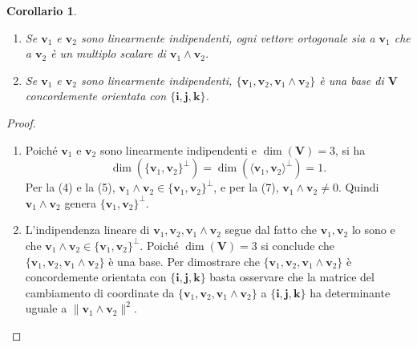 \documentclass{article}
\theoremstyle{plain}
\newtheorem{cor}{Corollario}
\theoremstyle{definition}
\theoremstyle{remark}
\begin{document}
\begin{bxthm}
\begin{cor}
\begin{enumerate}\hfill
\setcounter{enumi}{7}
\item Se $\mathbf{v}_1$ e $\mathbf{v}_2$ sono linearmente indipendenti, ogni vettore ortogonale sia a $\mathbf{v}_1$ che a $\mathbf{v}_2$ è un multiplo scalare di $\mathbf{v}_1 \wedge \mathbf{v}_2$.
\item Se $\mathbf{v}_1$ e $\mathbf{v}_2$ sono linearmente indipendenti, $\{\mathbf{v}_1, \mathbf{v}_2, \mathbf{v}_1 \wedge \mathbf{v}_2\}$ è una base di $\mathbf{V}$ concordemente orientata con $\{\mathbf{i}, \mathbf{j}, \mathbf{k}\}$.
\end{enumerate}    
\end{cor}
\end{bxthm}
\begin{proof}
\begin{enumerate}\hfill
\setcounter{enumi}{7}
\item Poiché $\mathbf{v}_1$ e $\mathbf{v}_2$ sono linearmente indipendenti e $\dim(\mathbf{V})=3$, si ha
\[
\dim\left( \{\mathbf{v}_1, \mathbf{v}_2\}^\perp \right) = \dim\left( \langle \mathbf{v}_1, \mathbf{v}_2 \rangle^\perp \right) = 1.
\]
Per la (4) e la (5), $\mathbf{v}_1 \wedge \mathbf{v}_2 \in \{ \mathbf{v}_1, \mathbf{v}_2 \}^\perp$, e per la (7), $\mathbf{v}_1 \wedge \mathbf{v}_2 \neq 0$. Quindi $\mathbf{v}_1 \wedge \mathbf{v}_2$ genera $\{ \mathbf{v}_1, \mathbf{v}_2 \}^\perp$.
\item L'indipendenza lineare di $\mathbf{v}_1, \mathbf{v}_2, \mathbf{v}_1 \wedge \mathbf{v}_2$ segue dal fatto che $\mathbf{v}_1, \mathbf{v}_2$ lo sono e che $\mathbf{v}_1 \wedge \mathbf{v}_2 \in \{ \mathbf{v}_1, \mathbf{v}_2 \}^\perp$. Poiché 
$\dim(\mathbf{V})=3$ si conclude che $\{\mathbf{v}_1, \mathbf{v}_2, \mathbf{v}_1 \wedge \mathbf{v}_2\}$ è una base.
Per dimostrare che $\{\mathbf{v}_1, \mathbf{v}_2, \mathbf{v}_1 \wedge \mathbf{v}_2\}$ è concordemente orientata con $\{\mathbf{i}, \mathbf{j}, \mathbf{k}\}$ basta osservare che la matrice del cambiamento di coordinate da $\{\mathbf{v}_1, \mathbf{v}_2, \mathbf{v}_1 \wedge \mathbf{v}_2\}$ a $\{\mathbf{i}, \mathbf{j}, \mathbf{k}\}$ ha determinante uguale a $\|\mathbf{v}_1 \wedge \mathbf{v}_2\|^2$.
\end{enumerate}    
\end{proof}

\vspace{10pt}
\end{document}
